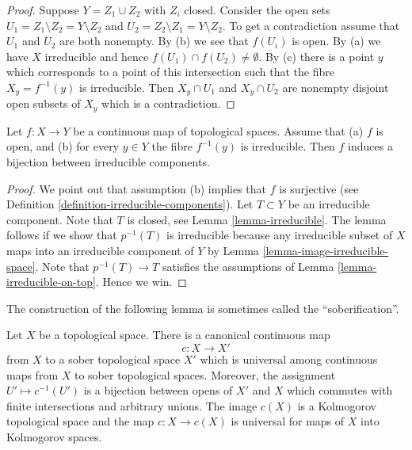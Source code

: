 \begin{proof}
Suppose $Y = Z_1 \cup Z_2$ with $Z_i$ closed.
Consider the open sets $U_1 = Z_1 \setminus Z_2 = Y \setminus Z_2$ and
$U_2 = Z_2 \setminus Z_1 = Y \setminus Z_2$. To get a contradiction
assume that $U_1$ and $U_2$ are both nonempty. By (b) we see that $f(U_i)$
is open. By (a) we have $X$ irreducible and hence
$f(U_1) \cap f(U_2) \not = \emptyset$. By (c) there is a point $y$ which
corresponds to a point of this intersection such that the fibre
$X_y = f^{-1}(y)$ is irreducible. Then $X_y \cap U_1$ and
$X_y \cap U_2$ are nonempty disjoint open subsets of $X_y$ which is
a contradiction.
\end{proof}

\begin{lemma}
\label{lemma-irreducible-fibres-irreducible-components}
Let $f : X \to Y$ be a continuous map of topological spaces.
Assume that (a) $f$ is open, and
(b) for every $y \in Y$ the fibre $f^{-1}(y)$ is irreducible.
Then $f$ induces a bijection between irreducible components.
\end{lemma}

\begin{proof}
We point out that assumption (b) implies that $f$ is surjective (see
Definition \ref{definition-irreducible-components}).
Let $T \subset Y$ be an irreducible component.
Note that $T$ is closed, see Lemma \ref{lemma-irreducible}.
The lemma follows if we show that $p^{-1}(T)$ is irreducible
because any irreducible subset of $X$ maps into an irreducible component
of $Y$ by Lemma \ref{lemma-image-irreducible-space}.
Note that $p^{-1}(T) \to T$ satisfies the assumptions
of Lemma \ref{lemma-irreducible-on-top}. Hence we win.
\end{proof}

\noindent
The construction of the following lemma is sometimes called
the ``soberification''.

\begin{lemma}
\label{lemma-make-sober}
Let $X$ be a topological space. There is a canonical continuous map
$$
c : X \longrightarrow X'
$$
from $X$ to a sober topological space $X'$ which is universal
among continuous maps from $X$ to sober topological spaces.
Moreover, the assignment $U' \mapsto c^{-1}(U')$ is a bijection
between opens of $X'$ and $X$ which commutes with finite intersections
and arbitrary unions.
The image $c(X)$ is a Kolmogorov topological space and the
map $c : X \to c(X)$ is universal for maps of $X$ into Kolmogorov spaces.
\end{lemma}

